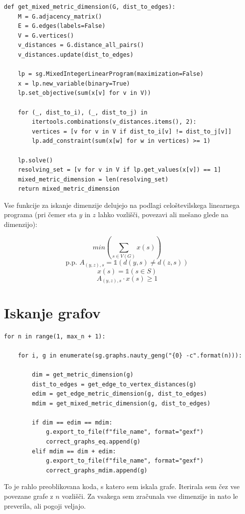 \documentclass[a4paper,12pt]{article}
\theoremstyle{definition}
\theoremstyle{remark}
\theoremstyle{definition}
\begin{document}
\begin{lstlisting}
def get_mixed_metric_dimension(G, dist_to_edges):
    M = G.adjacency_matrix()
    E = G.edges(labels=False)
    V = G.vertices()
    v_distances = G.distance_all_pairs()
    v_distances.update(dist_to_edges)

    lp = sg.MixedIntegerLinearProgram(maximization=False)
    x = lp.new_variable(binary=True)
    lp.set_objective(sum(x[v] for v in V))

    for (_, dist_to_i), (_, dist_to_j) in 
        itertools.combinations(v_distances.items(), 2):
        vertices = [v for v in V if dist_to_i[v] != dist_to_j[v]]
        lp.add_constraint(sum(x[w] for w in vertices) >= 1)

    lp.solve()
    resolving_set = [v for v in V if lp.get_values(x[v]) == 1]
    mixed_metric_dimension = len(resolving_set)
    return mixed_metric_dimension
\end{lstlisting}

Vse funkcije za iskanje dimenzije delujejo na podlagi celoštevilskega
linearnega programa (pri čemer sta $y$ in $z$ lahko vozlišči, povezavi ali mešano
glede na dimenzijo):

$$ min(\sum_{s\in V(G)}x(s)) $$
$$ \text{p.p. }
    A_{(y, z), s} = \mathds{1}(d(y, s) \neq d(z, s)) $$
$$   x(s) = \mathds{1}(s \in S) $$
$$   A_{(y, z), s} \cdot x(s) \geq 1 $$

\section*{Iskanje grafov}

\begin{lstlisting}
for n in range(1, max_n + 1):

    for i, g in enumerate(sg.graphs.nauty_geng("{0} -c".format(n))):

        dim = get_metric_dimension(g)
        dist_to_edges = get_edge_to_vertex_distances(g)
        edim = get_edge_metric_dimension(g, dist_to_edges)
        mdim = get_mixed_metric_dimension(g, dist_to_edges)

        if dim == edim == mdim:
            g.export_to_file(f"file_name", format="gexf")
            correct_graphs_eq.append(g)
        elif mdim == dim + edim:
            g.export_to_file(f"file_name", format="gexf")
            correct_graphs_mdim.append(g)
\end{lstlisting}

To je rahlo preoblikovana koda, s katero sem iskala grafe. Iterirala sem čez
vse povezane grafe z $n$ vozlišči. Za vsakega sem zračunala vse dimenzije in
nato le preverila, ali pogoji veljajo.
\end{document}
